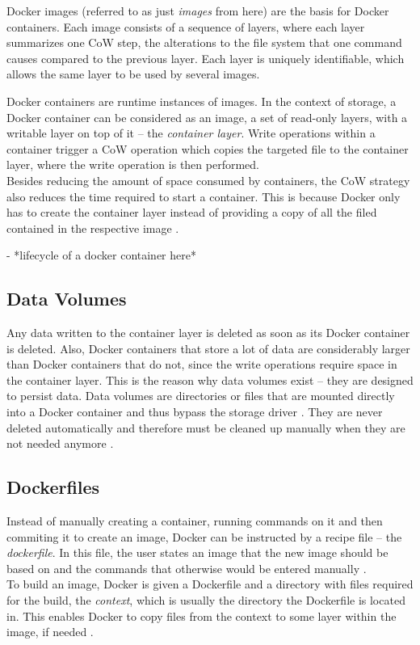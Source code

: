     Docker images (referred to as just \emph{images} from here) are the basis for Docker containers. Each image consists of a sequence of layers, where each layer summarizes one \ac{CoW} step, \ie the alterations to the file system that one command causes compared to the previous layer. Each layer is uniquely identifiable, which allows the same layer to be used by several images.

    Docker containers are runtime instances of images.
    In the context of storage, a Docker container can be considered as an image, \ie a set of read-only layers, with a writable layer on top of it -- the \emph{container layer}. Write operations within a container trigger a \ac{CoW} operation which copies the targeted file to the container layer, where the write operation is then performed. \\
    Besides reducing the amount of space consumed by containers, the \ac{CoW} strategy also reduces the time required to start a container. This is because Docker only has to create the container layer instead of providing a copy of all the filed contained in the respective image \cite{Docker????Dockera}.

    - *lifecycle of a docker container here*

  \subsection{Data Volumes} %
  \label{sub:data_volumes}
    Any data written to the container layer is deleted as soon as its Docker container is deleted.
    Also, Docker containers that store a lot of data are considerably larger than Docker containers that do not, since the write operations require space in the container layer. This is the reason why data volumes exist -- they are designed to persist data. Data volumes are directories or files that are mounted directly into a Docker container and thus bypass the storage driver \cite{Docker????Docker}. They are never deleted automatically and therefore must be cleaned up manually when they are not needed anymore \cite{Docker????Dockera}.


  \subsection{Dockerfiles} %
  \label{sub:dockerfiles}
    Instead of manually creating a container, running commands on it and then commiting it to create an image, Docker can be instructed by a recipe file -- the \emph{dockerfile}. In this file, the user states an image that the new image should be based on and the commands that otherwise would be entered manually \cite{Docker????Docker}. \\
    To build an image, Docker is given a Dockerfile and a directory with files required for the build, the \emph{context}, which is usually the directory the Dockerfile is located in. This enables Docker to copy files from the context to some layer within the image, if needed \cite{Docker????Docker}.

